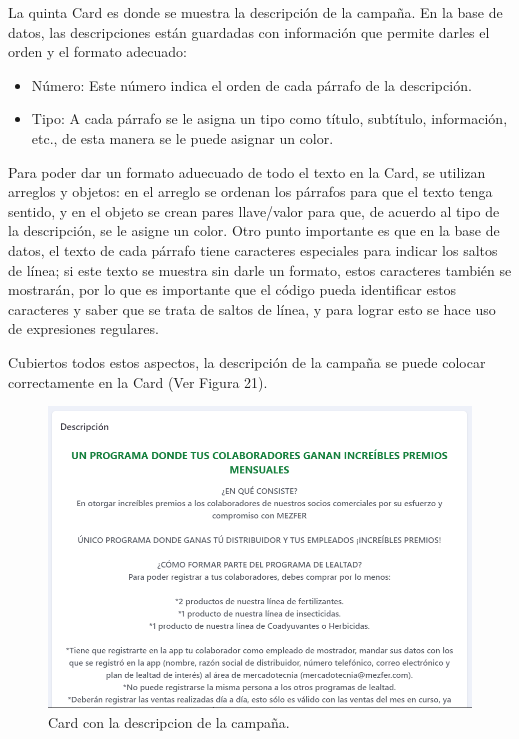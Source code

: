 La quinta Card es donde se muestra la descripción de la campaña. En la base de datos, las descripciones están guardadas con información que permite darles el orden y el formato adecuado:
    \begin{itemize}
        \item Número: Este número indica el orden de cada párrafo de la descripción.
        \item Tipo: A cada párrafo se le asigna un tipo como título, subtítulo, información, etc., de esta manera se le puede asignar un color.
    \end{itemize}

Para poder dar un formato aduecuado de todo el texto en la Card, se utilizan arreglos y objetos: en el arreglo se ordenan los párrafos para que el texto tenga sentido, y en el objeto se crean pares llave/valor para que, de acuerdo al tipo de la descripción, se le asigne un color. Otro punto importante es que en la base de datos, el texto de cada párrafo tiene caracteres especiales para indicar los saltos de línea; si este texto se muestra sin darle un formato, estos caracteres también se mostrarán, por lo que es importante que el código pueda identificar estos caracteres y saber que se trata de saltos de línea, y para lograr esto se hace uso de expresiones regulares.

Cubiertos todos estos aspectos, la descripción de la campaña se puede colocar correctamente en la Card (Ver Figura 21).

    \begin{figure}[H]
        \begin{center}
            \includegraphics[scale=0.40]{img/actividades/detalles-campanias/card-descripcion.png}
            \caption{Card con la descripcion de la campaña.}
            \label{fig:card-descripcion}
        \end{center}
    \end{figure}


